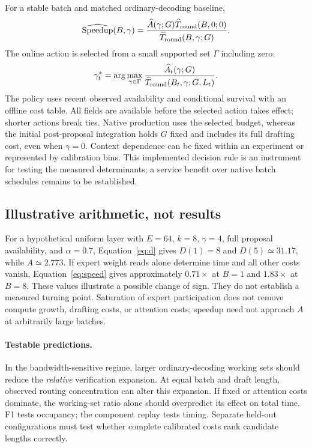 \documentclass[10pt,twocolumn]{article}
\begin{document}
For a stable batch and matched ordinary-decoding baseline,
\begin{equation}\label{eq:speed}
\widehat{\rm Speedup}(B,\gamma)=
\frac{\widehat A(\gamma;G)\widehat T_{\rm round}(B,0;0)}
{\widehat T_{\rm round}(B,\gamma;G)}.
\end{equation}
The online action is selected from a small supported set $\Gamma$ including zero:
\begin{equation}\label{eq:policy}
\gamma_t^*=\arg\max_{\gamma\in\Gamma}
\frac{\widehat A_t(\gamma;G)}
{\widehat T_{\rm round}(B_t,\gamma;G,L_t)}.
\end{equation}
The policy uses recent observed availability and conditional survival with an offline cost table. All fields are available before the selected action takes effect; shorter actions break ties. Native production uses the selected budget, whereas the initial post-proposal integration holds $G$ fixed and includes its full drafting cost, even when $\gamma=0$. Context dependence can be fixed within an experiment or represented by calibration bins. This implemented decision rule is an instrument for testing the measured determinants; a service benefit over native batch schedules remains to be established.

\subsection{Illustrative arithmetic, not results}\label{sec:illustration}
For a hypothetical uniform layer with $E=64$, $k=8$, $\gamma=4$, full proposal availability, and $\alpha=0.7$, Equation~\ref{eq:d} gives $D(1)=8$ and $D(5)\simeq31.17$, while $A\simeq2.773$. If expert weight reads alone determine time and all other costs vanish, Equation~\ref{eq:speed} gives approximately $0.71\times$ at $B=1$ and $1.83\times$ at $B=8$. These values illustrate a possible change of sign. They do not establish a measured turning point. Saturation of expert participation does not remove compute growth, drafting costs, or attention costs; speedup need not approach $A$ at arbitrarily large batches.

\paragraph{Testable predictions.} In the bandwidth-sensitive regime, larger ordinary-decoding working sets should reduce the \emph{relative} verification expansion. At equal batch and draft length, observed routing concentration can alter this expansion. If fixed or attention costs dominate, the working-set ratio alone should overpredict its effect on total time. F1 tests occupancy; the component replay tests timing. Separate held-out configurations must test whether complete calibrated costs rank candidate lengths correctly.
\end{document}
